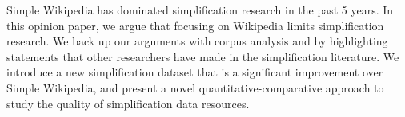 Simple Wikipedia has dominated simplification research in the past 5 years. In this opinion paper, we argue that focusing on Wikipedia limits simplification research. We back up our arguments with corpus analysis and by highlighting statements that other researchers have made in the simplification literature. We introduce a new simplification dataset that is a significant improvement over Simple Wikipedia, and present a novel quantitative-comparative approach to study the quality of simplification data resources.
